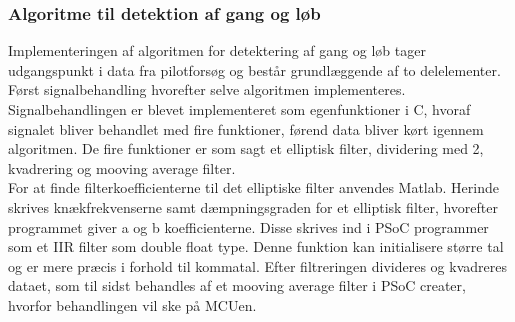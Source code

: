 \subsubsection{Algoritme til detektion af gang og løb}
Implementeringen af algoritmen for detektering af gang og løb tager udgangspunkt i data fra pilotforsøg og består grundlæggende af to delelementer. Først signalbehandling hvorefter selve algoritmen implementeres. Signalbehandlingen er blevet implementeret som egenfunktioner i C, hvoraf signalet bliver behandlet med fire funktioner, førend data bliver kørt igennem algoritmen. De fire funktioner er som sagt et elliptisk filter, dividering med 2, kvadrering og mooving average filter. \\
For at finde filterkoefficienterne til det elliptiske filter anvendes Matlab. Herinde skrives knækfrekvenserne samt dæmpningsgraden for et elliptisk filter, hvorefter programmet giver a og b koefficienterne. Disse skrives ind i PSoC programmer som et IIR filter som double float type. Denne funktion kan initialisere større tal og er mere præcis i forhold til kommatal. Efter filtreringen divideres og kvadreres dataet, som til sidst behandles af et mooving average filter i PSoC creater, hvorfor behandlingen vil ske på MCUen.


